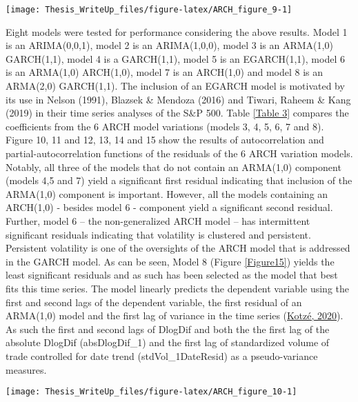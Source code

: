 \documentclass[11pt,preprint, authoryear]{elsarticle}
\let\origfigure\figure
\let\endorigfigure\endfigure
\renewenvironment{figure}[1][2] {
    \expandafter\origfigure\expandafter[H]
} {
    \endorigfigure
}
\numberwithin{equation}{section}
\numberwithin{figure}{section}
\numberwithin{table}{section}
\begin{document}
\begin{figure}[H]

{\centering \texttt{[image: Thesis\_WriteUp\_files/figure-latex/ARCH\_figure\_9-1]} 

}

\caption{Autocorrelation and partial-autocorrelation functions of absolute LogDiff \label{Figure9}}\label{fig:ARCH_figure_9}
\end{figure}

Eight models were tested for performance considering the above results.
Model 1 is an ARIMA(0,0,1), model 2 is an ARIMA(1,0,0), model 3 is an
ARMA(1,0) GARCH(1,1), model 4 is a GARCH(1,1), model 5 is an
EGARCH(1,1), model 6 is an ARMA(1,0) ARCH(1,0), model 7 is an ARCH(1,0)
and model 8 is an ARMA(2,0) GARCH(1,1). The inclusion of an EGARCH model
is motivated by its use in Nelson (1991), Blazsek \& Mendoza (2016) and
Tiwari, Raheem \& Kang (2019) in their time series analyses of the S\&P
500. Table \ref{Table 3} compares the coefficients from the 6 ARCH model
variations (models 3, 4, 5, 6, 7 and 8). Figure 10, 11 and 12, 13, 14
and 15 show the results of autocorrelation and partial-autocorrelation
functions of the residuals of the 6 ARCH variation models. Notably, all
three of the models that do not contain an ARMA(1,0) component (models
4,5 and 7) yield a significant first residual indicating that inclusion
of the ARMA(1,0) component is important. However, all the models
containing an ARCH(1,0) - besides model 6 - component yield a
significant second residual. Further, model 6 -- the non-generalized
ARCH model -- has intermittent significant residuals indicating that
volatility is clustered and persistent. Persistent volatility is one of
the oversights of the ARCH model that is addressed in the GARCH model.
As can be seen, Model 8 (Figure \ref{Figure15}) yields the least
significant residuals and as such has been selected as the model that
best fits this time series. The model linearly predicts the dependent
variable using the first and second lags of the dependent variable, the
first residual of an ARMA(1,0) model and the first lag of variance in
the time series (\protect\hyperlink{ref-kotze2020univariate}{Kotzé,
2020}). As such the first and second lags of DlogDif and both the the
first lag of the absolute DlogDif (absDlogDif\_1) and the first lag of
standardized volume of trade controlled for date trend
(stdVol\_1DateResid) as a pseudo-variance measures.

\begin{figure}[H]

{\centering \texttt{[image: Thesis\_WriteUp\_files/figure-latex/ARCH\_figure\_10-1]} 

}

\caption{Autocorrelation and partial-autocorrelation functions of model 3 - ARMA(1,0) GARCH(1,1) - residuals \label{Figure10}}\label{fig:ARCH_figure_10}
\end{figure}
\end{document}
